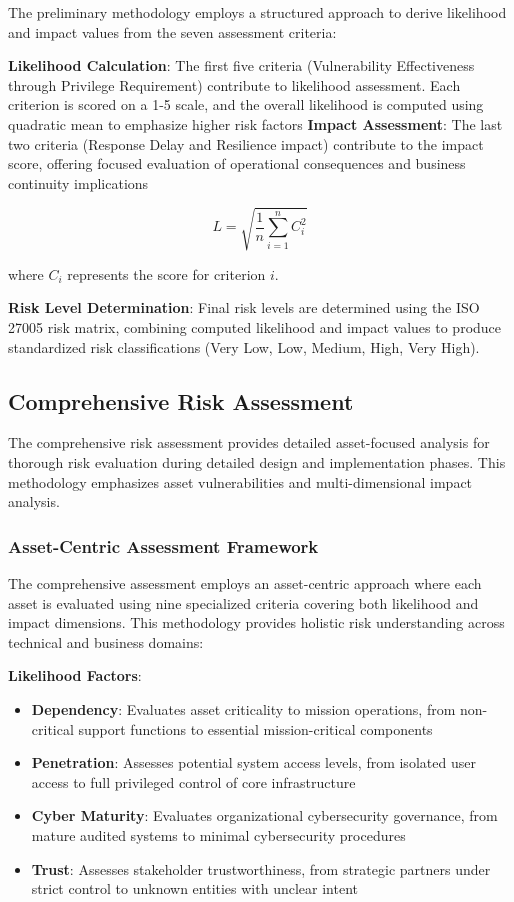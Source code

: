 \documentclass[binding=0.6cm]{sapthesis}
\begin{document}
The preliminary methodology employs a structured approach to derive likelihood and impact values from the seven assessment criteria:

\textbf{Likelihood Calculation}: The first five criteria (Vulnerability Effectiveness through Privilege Requirement) contribute to likelihood assessment. Each criterion is scored on a 1-5 scale, and the overall likelihood is computed using quadratic mean to emphasize higher risk factors
\textbf{Impact Assessment}: The last two criteria (Response Delay and Resilience impact) contribute to the impact score, offering focused evaluation of operational consequences and business continuity implications

$$L = \sqrt{\frac{1}{n}\sum_{i=1}^{n} C_i^2}$$

where $C_i$ represents the score for criterion $i$.


\textbf{Risk Level Determination}: Final risk levels are determined using the ISO 27005 risk matrix, combining computed likelihood and impact values to produce standardized risk classifications (Very Low, Low, Medium, High, Very High).

\subsection{Comprehensive Risk Assessment}

The comprehensive risk assessment provides detailed asset-focused analysis for thorough risk evaluation during detailed design and implementation phases. This methodology emphasizes asset vulnerabilities and multi-dimensional impact analysis.

\subsubsection{Asset-Centric Assessment Framework}

The comprehensive assessment employs an asset-centric approach where each asset is evaluated using nine specialized criteria covering both likelihood and impact dimensions. This methodology provides holistic risk understanding across technical and business domains:

\textbf{Likelihood Factors}:
\begin{itemize}
    \item \textbf{Dependency}: Evaluates asset criticality to mission operations, from non-critical support functions to essential mission-critical components
    \item \textbf{Penetration}: Assesses potential system access levels, from isolated user access to full privileged control of core infrastructure
    \item \textbf{Cyber Maturity}: Evaluates organizational cybersecurity governance, from mature audited systems to minimal cybersecurity procedures
    \item \textbf{Trust}: Assesses stakeholder trustworthiness, from strategic partners under strict control to unknown entities with unclear intent
\end{itemize}
\end{document}
